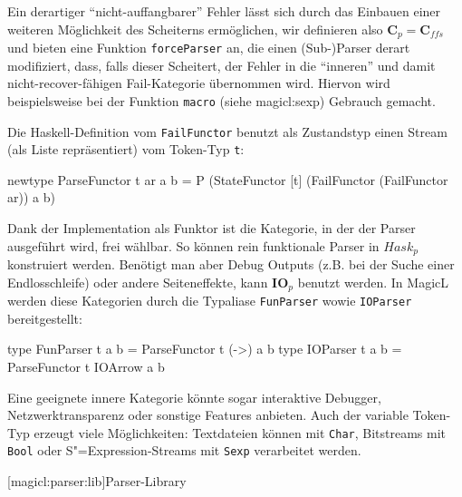 \documentclass[a4paper, bibgerm]{book}
\newcommand\icode[1]{\lstinline?#1?}
\newcommand\lsubsection{}
\newcommand\sref{}
\newcommand{\sees}[1]{(siehe \sref{#1})}
\newcommand{\sexp}{S"=Expression}
\begin{document}
Ein derartiger "`nicht-auffangbarer"' Fehler lässt sich durch das
Einbauen einer weiteren Möglichkeit des Scheiterns ermöglichen, wir
definieren also $\mathbf{C}_p = \mathbf{C}_{ffs}$ und bieten eine
Funktion \icode{forceParser} an, die einen (Sub-)Parser derart
modifiziert, dass, falls dieser Scheitert, der Fehler in die "`inneren"'
und damit nicht-recover-fähigen Fail-Kategorie übernommen wird. Hiervon
wird beispielsweise bei der Funktion \icode{macro}
\sees{magicl:sexp} Gebrauch gemacht.

Die Haskell-Definition vom \icode{FailFunctor} benutzt als Zustandstyp
einen Stream (als Liste repräsentiert) vom Token-Typ \icode{t}:

\begin{code}
newtype ParseFunctor t ar a b =
  P (StateFunctor
     [t]
     (FailFunctor (FailFunctor ar))
     a
     b)
\end{code}

Dank der Implementation als Funktor ist die Kategorie, in der der Parser
ausgeführt wird, frei wählbar. So können rein funktionale Parser in
$Hask_p$ konstruiert werden. Benötigt man aber Debug Outputs (z.B. bei
der Suche einer Endlosschleife) oder andere Seiteneffekte, kann
$\mathbf{IO}_p$ benutzt werden. In MagicL werden diese Kategorien durch
die Typaliase \icode{FunParser} wowie \icode{IOParser} bereitgestellt:
\begin{code}
type FunParser t a b = ParseFunctor t (->) a b
type IOParser  t a b = ParseFunctor t IOArrow a b
\end{code}
Eine geeignete innere Kategorie könnte
sogar interaktive Debugger, Netzwerktransparenz oder sonstige Features
anbieten. Auch der variable Token-Typ erzeugt viele Möglichkeiten:
Textdateien können mit \icode{Char}, Bitstreams mit \icode{Bool} oder
\sexp{}-Streams mit \icode{Sexp} verarbeitet werden.

\lsubsection[magicl:parser:lib]{Parser-Library}
\end{document}
